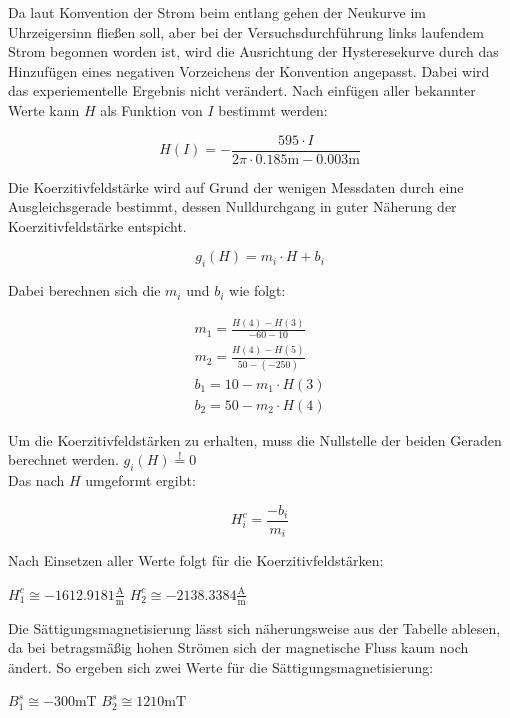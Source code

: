 Da laut Konvention der Strom beim entlang gehen der Neukurve im Uhrzeigersinn fließen soll, aber 
bei der Versuchsdurchführung links laufendem Strom begonnen worden ist, wird die Ausrichtung der Hysteresekurve
durch das Hinzufügen eines negativen Vorzeichens der Konvention angepasst. Dabei wird das experiementelle
Ergebnis nicht verändert.
Nach einfügen aller bekannter Werte kann $H$ als Funktion von $I$ bestimmt werden:

\begin{equation}
H(I)=-\frac{595\cdot I}{2\pi \cdot 0.185\si{\m}-0.003\si{\m}}
\end{equation}

Die Koerzitivfeldstärke wird auf Grund der wenigen Messdaten durch eine Ausgleichsgerade bestimmt, dessen
Nulldurchgang in guter Näherung der Koerzitivfeldstärke entspicht.

\begin{equation}
g_i(H)=m_i\cdot H+b_i
\end{equation}
  
Dabei berechnen sich die $m_i$ und $b_i$ wie folgt:

\begin{gather}
m_1=\frac{H(4)-H(3)}{-60-10} \\
m_2=\frac{H(4)-H(5)}{50-(-250)}\\
b_1=10-m_1\cdot H(3)\\
b_2=50-m_2\cdot H(4)
\end{gather}

Um die Koerzitivfeldstärken zu erhalten, muss die Nullstelle der beiden Geraden berechnet werden. \quad $g_i(H) \stackrel{!}{=}0$\\
Das nach $H$ umgeformt ergibt:

\begin{equation}
H_{i}^{c}=\frac{-b_i}{m_i}
\end{equation}

Nach Einsetzen aller Werte folgt für die Koerzitivfeldstärken:

\quad $H_{1}^{c}\cong -1612.9181 \frac{\si{\ampere}}{\si{\m}}$
\quad $H_{2}^{c}\cong -2138.3384 \frac{\si{\ampere}}{\si{\m}}$

Die Sättigungsmagnetisierung lässt sich näherungsweise aus der Tabelle ablesen, da bei betragsmäßig hohen
Strömen sich der magnetische Fluss kaum noch ändert. So ergeben sich zwei Werte für die Sättigungsmagnetisierung:

\quad $B_{1}^{s}\cong -300 \si{\milli\tesla}$
\quad $B_{2}^{s}\cong 1210 \si{\milli\tesla}$























